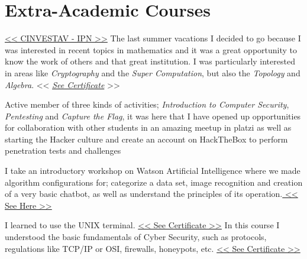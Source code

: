 \documentclass[]{friggeri-cv}
\begin{document}
\section{Extra-Academic Courses}
\begin{entrylist}
 
  
  {\href{https://www.math.cinvestav.mx}{<< CINVESTAV - IPN >>}}
  {
  The last summer vacations I decided to go because I was interested in recent topics in mathematics and it was a great opportunity to know the work of others and that great institution. I was particularly interested in areas like \textit{Cryptography} and the \textit{Super Computation}, but also the \textit{Topology} and \textit {Algebra}.
   << \href{https://drive.google.com/file/d/0BxsBj4oBVw3fMlVjQXlfOGl3VHhYUm15RlRlQXVHMHE1Nm9Z/view?usp=sharing}{\textit{See Certificate}} >>
  }
  
  {
 Active member of three kinds of activities; \textit{Introduction to Computer Security}, \textit{Pentesting} and \textit{Capture the Flag}, it was here that I have opened up opportunities for collaboration with other students in an amazing meetup in platzi as well as starting the Hacker culture and create an account on HackTheBox to perform penetration tests and challenges}
  
  {I take an introductory workshop on Watson Artificial Intelligence where we made algorithm configurations for; categorize a data set, image recognition and creation of a very basic chatbot, as well as understand the principles of its operation.\href{https://drive.google.com/file/d/1HZNd6Rm6PFyitDFkMpKJaU-E61z-BiQa/view?usp=sharing}{ << See Here >>}
  }
  
  {
  I learned to use the UNIX terminal.
  \href{https://drive.google.com/file/d/1mlRopoqhOzYW9gVK44IMv5gWyx7ri1Oq/view?usp=sharing}{ << See Certificate >>}
  }
  {In this course I understood the basic fundamentals of Cyber Security, such as protocols, regulations like TCP/IP or OSI, firewalls, honeypots, etc.
  \href{https://drive.google.com/file/d/1rxih1q_8NExuBfgGRTgl7nB13LWx3TEf/view?usp=sharing}{<< See Certificate >>}
  }
 

\end{entrylist}
\end{document}
